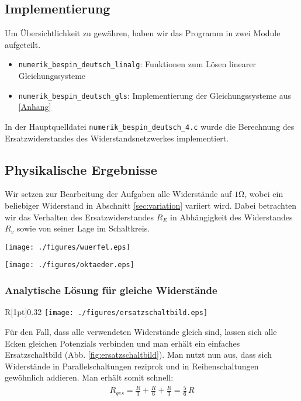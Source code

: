 \documentclass[10pt,a4paper]{article}
\begin{document}
\subsection{Implementierung}
Um Übersichtlichkeit zu gewähren, haben wir das Programm in zwei Module aufgeteilt. 
\begin{itemize}
	\item \texttt{numerik\_bespin\_deutsch\_linalg}: Funktionen zum Lösen linearer Gleichungssysteme
	\item \texttt{numerik\_bespin\_deutsch\_gls}: Implementierung der Gleichungssysteme aus \ref{Anhang}
\end{itemize}
In der Hauptquelldatei \texttt{numerik\_bespin\_deutsch\_4.c} wurde die Berechnung des Ersatzwiderstandes des Widerstandsnetzwerkes implementiert.

\subsection{Physikalische Ergebnisse}

Wir setzen zur Bearbeitung der Aufgaben alle Widerstände auf $\num{1}\si{\ohm}$, wobei ein beliebiger Widerstand in Abschnitt \ref{sec:variation} variiert wird. Dabei betrachten wir das Verhalten des Ersatzwiderstandes $R_E$ in Abhängigkeit des Widerstandes $R_v$ sowie von seiner Lage im Schaltkreis.

\vspace{8pt}
\begin{minipage}[c]{0.47\textwidth}
\captionsetup{type=figure}
\begin{center}
\texttt{[image: ./figures/wuerfel.eps]}
\vspace{10pt}
\end{center}
\end{minipage}
\begin{minipage}[c]{0.47\textwidth}
\captionsetup{type=figure}
\begin{center}
\texttt{[image: ./figures/oktaeder.eps]}
\end{center}
\end{minipage}

\subsubsection{Analytische Lösung für gleiche Widerstände}
\label{auswertung}
\begin{wrapfigure}[15]{R}[1pt]{0.32\textwidth}
\centering
\texttt{[image: ./figures/ersatzschaltbild.eps]}
\caption{Schaltbild für gleiche Widerstände $R$}
\label{fig:ersatzschaltbild}
\end{wrapfigure}
Für den Fall, dass alle verwendeten Widerstände gleich sind, lassen sich alle Ecken gleichen Potenzials verbinden und man erhält ein einfaches Ersatzschaltbild (Abb. \ref{fig:ersatzschaltbild}). Man nutzt nun aus, dass sich Widerstände in Parallelschaltungen reziprok und in Reihenschaltungen gewöhnlich addieren. Man erhält somit schnell:
\begin{align}
R_{ges}=\frac{R}{3}+\frac{R}{6}+\frac{R}{3}=\frac{5}{6}\,R
\end{align}
\end{document}
